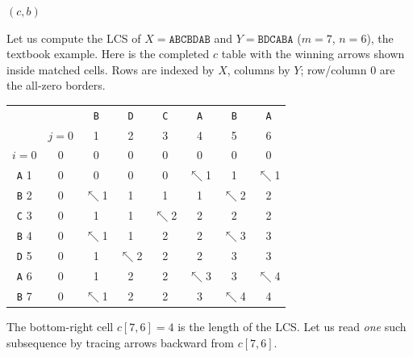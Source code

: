 \begin{algorithm}[H]
\caption{\textsc{LCS-Length}$(X, Y)$}
\Return $(c, b)$\;
\end{algorithm}

\begin{labbox}
Let us compute the LCS of $X = \texttt{ABCBDAB}$ and $Y = \texttt{BDCABA}$
($m=7$, $n=6$), the textbook example. Here is the completed $c$ table with the
winning arrows shown inside matched cells. Rows are indexed by $X$, columns by
$Y$; row/column $0$ are the all-zero borders.

\begin{center}
\setlength{\arraycolsep}{4pt}
\begin{tabular}{c|c|cccccc}
 & & \texttt{B} & \texttt{D} & \texttt{C} & \texttt{A} & \texttt{B} & \texttt{A} \\
 & $j{=}0$ & 1 & 2 & 3 & 4 & 5 & 6 \\
\hline
$i{=}0$ & 0 & 0 & 0 & 0 & 0 & 0 & 0 \\
\texttt{A} 1 & 0 & 0 & 0 & 0 & $\nwarrow$1 & 1 & $\nwarrow$1 \\
\texttt{B} 2 & 0 & $\nwarrow$1 & 1 & 1 & 1 & $\nwarrow$2 & 2 \\
\texttt{C} 3 & 0 & 1 & 1 & $\nwarrow$2 & 2 & 2 & 2 \\
\texttt{B} 4 & 0 & $\nwarrow$1 & 1 & 2 & 2 & $\nwarrow$3 & 3 \\
\texttt{D} 5 & 0 & 1 & $\nwarrow$2 & 2 & 2 & 3 & 3 \\
\texttt{A} 6 & 0 & 1 & 2 & 2 & $\nwarrow$3 & 3 & $\nwarrow$4 \\
\texttt{B} 7 & 0 & $\nwarrow$1 & 2 & 2 & 3 & $\nwarrow$4 & 4 \\
\end{tabular}
\end{center}

The bottom-right cell $c[7,6] = 4$ is the length of the LCS. Let us read
\emph{one} such subsequence by tracing arrows backward from $c[7,6]$.
\end{labbox}

